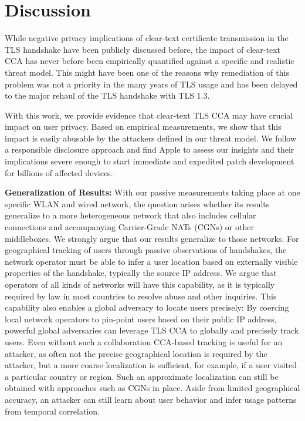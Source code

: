 \section{Discussion}%
\label{sec:discussion}
%
While negative privacy implications of clear-text certificate transmission in the TLS handshake have been publicly discussed before, the impact of clear-text CCA has never before been empirically quantified against a specific and realistic threat model.
This might have been one of the reasons why remediation of this problem was not a priority in the many years of TLS usage and has been delayed to the major rehaul of the TLS handshake with TLS 1.3.

With this work, we provide evidence that clear-text TLS CCA may have crucial impact on user privacy.
Based on empirical measurements, we show that this impact is easily abusable by the attackers defined in our threat model.
We follow a responsible disclosure approach and find Apple to assess our insights and their implications severe enough to start immediate and expedited patch development for billions of affected devices.

\textbf{Generalization of Results: }%
With our passive measurements taking place at one specific WLAN and wired network, the question arises whether its results generalize to a more heterogeneous network that also includes cellular connections and accompanying Carrier-Grade NATs (CGNs) or other middleboxes.
We strongly argue that our results generalize to those networks.
For geographical tracking of users through passive observations of {\apns} handshakes, the network operator must be able to infer a user location based on externally visible properties of the handshake, typically the source IP address.
We argue that operators of all kinds of networks will have this capability, as it is typically required by law in most countries to resolve abuse and other inquiries.
This capability also enables a global adversary to locate users precisely: By coercing local network operators to pin-point users based on their public IP address, powerful global adversaries can leverage TLS CCA to globally and precisely track users.
Even without such a collaboration CCA-based tracking is useful for an attacker, as often not the precise geographical location is required by the attacker, but a more coarse localization is sufficient, for example, if a user visited a particular country or region. 
Such an approximate localization can still be obtained with approaches such as CGNs in place.
Aside from limited geographical accuracy, an attacker can still learn about user behavior and
infer usage patterns from temporal correlation.

